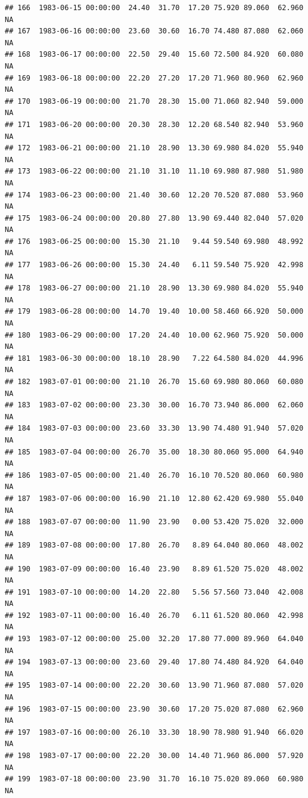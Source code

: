 \documentclass{article}\usepackage{graphicx, color}
\makeatletter
\newenvironment{kframe}{%
 \def\at@end@of@kframe{}%
 \ifinner\ifhmode%
  \def\at@end@of@kframe{\end{minipage}}%
  \begin{minipage}{\columnwidth}%
 \fi\fi%
 \def\FrameCommand##1{\hskip\@totalleftmargin \hskip-\fboxsep
 \colorbox{shadecolor}{##1}\hskip-\fboxsep
     \hskip-\linewidth \hskip-\@totalleftmargin \hskip\columnwidth}%
 \MakeFramed {\advance\hsize-\width
   \@totalleftmargin\z@ \linewidth\hsize
   \@setminipage}}%
 {\par\unskip\endMakeFramed%
 \at@end@of@kframe}
\newenvironment{knitrout}{}{} %
\makeatother
\begin{document}
\begin{knitrout}
\begin{kframe}
\begin{verbatim}
## 166  1983-06-15 00:00:00  24.40  31.70  17.20 75.920 89.060  62.960     NA
## 167  1983-06-16 00:00:00  23.60  30.60  16.70 74.480 87.080  62.060     NA
## 168  1983-06-17 00:00:00  22.50  29.40  15.60 72.500 84.920  60.080     NA
## 169  1983-06-18 00:00:00  22.20  27.20  17.20 71.960 80.960  62.960     NA
## 170  1983-06-19 00:00:00  21.70  28.30  15.00 71.060 82.940  59.000     NA
## 171  1983-06-20 00:00:00  20.30  28.30  12.20 68.540 82.940  53.960     NA
## 172  1983-06-21 00:00:00  21.10  28.90  13.30 69.980 84.020  55.940     NA
## 173  1983-06-22 00:00:00  21.10  31.10  11.10 69.980 87.980  51.980     NA
## 174  1983-06-23 00:00:00  21.40  30.60  12.20 70.520 87.080  53.960     NA
## 175  1983-06-24 00:00:00  20.80  27.80  13.90 69.440 82.040  57.020     NA
## 176  1983-06-25 00:00:00  15.30  21.10   9.44 59.540 69.980  48.992     NA
## 177  1983-06-26 00:00:00  15.30  24.40   6.11 59.540 75.920  42.998     NA
## 178  1983-06-27 00:00:00  21.10  28.90  13.30 69.980 84.020  55.940     NA
## 179  1983-06-28 00:00:00  14.70  19.40  10.00 58.460 66.920  50.000     NA
## 180  1983-06-29 00:00:00  17.20  24.40  10.00 62.960 75.920  50.000     NA
## 181  1983-06-30 00:00:00  18.10  28.90   7.22 64.580 84.020  44.996     NA
## 182  1983-07-01 00:00:00  21.10  26.70  15.60 69.980 80.060  60.080     NA
## 183  1983-07-02 00:00:00  23.30  30.00  16.70 73.940 86.000  62.060     NA
## 184  1983-07-03 00:00:00  23.60  33.30  13.90 74.480 91.940  57.020     NA
## 185  1983-07-04 00:00:00  26.70  35.00  18.30 80.060 95.000  64.940     NA
## 186  1983-07-05 00:00:00  21.40  26.70  16.10 70.520 80.060  60.980     NA
## 187  1983-07-06 00:00:00  16.90  21.10  12.80 62.420 69.980  55.040     NA
## 188  1983-07-07 00:00:00  11.90  23.90   0.00 53.420 75.020  32.000     NA
## 189  1983-07-08 00:00:00  17.80  26.70   8.89 64.040 80.060  48.002     NA
## 190  1983-07-09 00:00:00  16.40  23.90   8.89 61.520 75.020  48.002     NA
## 191  1983-07-10 00:00:00  14.20  22.80   5.56 57.560 73.040  42.008     NA
## 192  1983-07-11 00:00:00  16.40  26.70   6.11 61.520 80.060  42.998     NA
## 193  1983-07-12 00:00:00  25.00  32.20  17.80 77.000 89.960  64.040     NA
## 194  1983-07-13 00:00:00  23.60  29.40  17.80 74.480 84.920  64.040     NA
## 195  1983-07-14 00:00:00  22.20  30.60  13.90 71.960 87.080  57.020     NA
## 196  1983-07-15 00:00:00  23.90  30.60  17.20 75.020 87.080  62.960     NA
## 197  1983-07-16 00:00:00  26.10  33.30  18.90 78.980 91.940  66.020     NA
## 198  1983-07-17 00:00:00  22.20  30.00  14.40 71.960 86.000  57.920     NA
## 199  1983-07-18 00:00:00  23.90  31.70  16.10 75.020 89.060  60.980     NA

\end{verbatim}
\end{kframe}
\end{knitrout}
\end{document}
